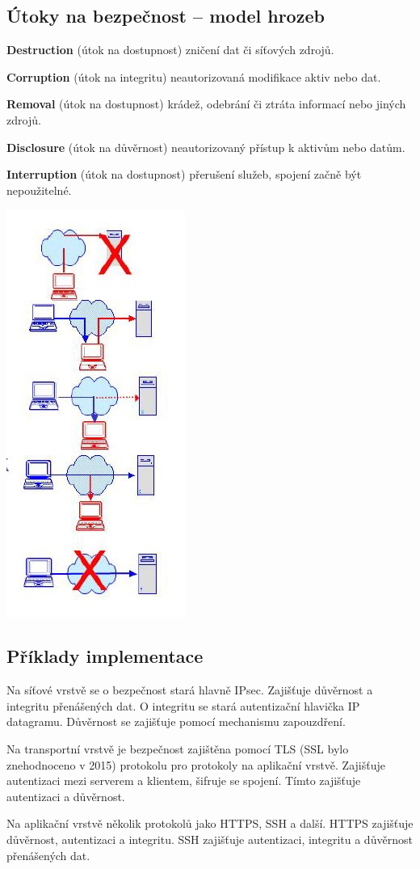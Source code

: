 \subsection{Útoky na bezpečnost -- model hrozeb}
\begin{multicols}{2}
\noindent \textbf{Destruction} (útok na dostupnost) zničení dat či síťových zdrojů.

\noindent \textbf{Corruption} (útok na integritu) neautorizovaná modifikace aktiv nebo dat.

\noindent \textbf{Removal} (útok na dostupnost) krádež, odebrání či ztráta informací nebo jiných zdrojů.

\noindent \textbf{Disclosure} (útok na důvěrnost) neautorizovaný přístup k aktivům nebo datům.

\noindent \textbf{Interruption} (útok na dostupnost) přerušení služeb, spojení začně být nepoužitelné.

\begin{center}
    \includegraphics[scale = 0.6]{images/threatModel.JPG}
\end{center}
\end{multicols}

\subsection{Příklady implementace}

Na síťové vrstvě se o bezpečnost stará hlavně IPsec. Zajišťuje důvěrnost a integritu přenášených dat. O integritu se stará autentizační hlavička IP datagramu. Důvěrnost se zajišťuje pomocí mechanismu zapouzdření.

Na transportní vrstvě je bezpečnost zajištěna pomocí TLS (SSL bylo znehodnoceno v 2015) protokolu pro protokoly na aplikační vrstvě. Zajišťuje autentizaci mezi serverem a klientem, šifruje se spojení. Tímto zajišťuje autentizaci a důvěrnost.

Na aplikační vrstvě několik protokolů jako HTTPS, SSH a další. HTTPS zajišťuje důvěrnost, autentizaci a integritu. SSH zajišťuje autentizaci, integritu a důvěrnost přenášených dat.